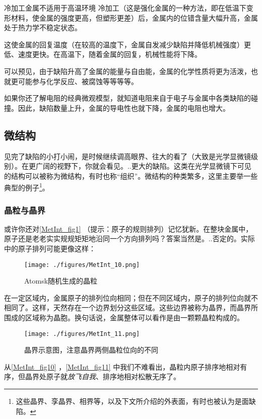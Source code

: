\begin{example}{冷加工金属不适用于高温环境}
冷加工（这是强化金属的一种方法，即在低温下变形材料，使金属的强度更高，但塑形更差）后，金属内的位错含量大幅升高，金属处于热力学不稳定状态。

这使金属的回复温度（在较高的温度下，金属自发减少缺陷并降低机械强度）更低、速度更快。在高温下，随着金属的回复，机械性能将下降。
\end{example}

可以预见，由于缺陷升高了金属的能量与自由能，金属的化学性质将更为活泼，也就更可能参与化学反应、被腐蚀等等等等。

如果你还了解电阻的经典微观模型，就知道电阻来自于电子与金属中各类缺陷的碰撞。因此，缺陷数量上升，金属的导电性也就下降，金属的电阻也增大。

\subsection{微结构}
见完了缺陷的小打小闹，是时候继续调高眼界、往大的看了（大致是光学显微镜级别）。在更广阔的视野下，你就会看见。..更大的缺陷。这类在光学显微镜下可见的结构可以被称为微结构，有时也称“组织”。微结构的种类繁多，这里主要举一些典型的例子\footnote{这些晶界、孪晶界、相界等，以及下文所介绍的外表面，有时也被认为是面缺陷。}。

\subsubsection{晶粒与晶界}
或许你还对\autoref{MetInt_fig1} （提示：原子的规则排列）记忆犹新。在整块金属中，原子还是老老实实规规矩矩地沿同一个方向排列吗？答案当然是。..否定的。实际中的原子排列可能更像这样：
\begin{figure}[ht]
\centering
\texttt{[image: ./figures/MetInt\_10.png]}
\caption{Atomsk随机生成的晶粒} \label{MetInt_fig10}
\end{figure}
在一定区域内，金属原子的排列位向相同；但在不同区域内，原子的排列位向就不相同了。这样，天然存在一个边界划分这些区域。这些边界被称为晶界，而晶界所围成的区域称为晶胞。换句话说，金属整体可以看作是由一颗颗晶粒构成的。
\begin{figure}[ht]
\centering
\texttt{[image: ./figures/MetInt\_11.png]}
\caption{晶界示意图，注意晶界两侧晶粒位向的不同} \label{MetInt_fig11}
\end{figure}
从\autoref{MetInt_fig10} ，\autoref{MetInt_fig11} 中我们不难看出，晶粒内原子排序地相对有序，但晶界处原子就\textsl{放飞自我}、排序地相对松散无序了。

